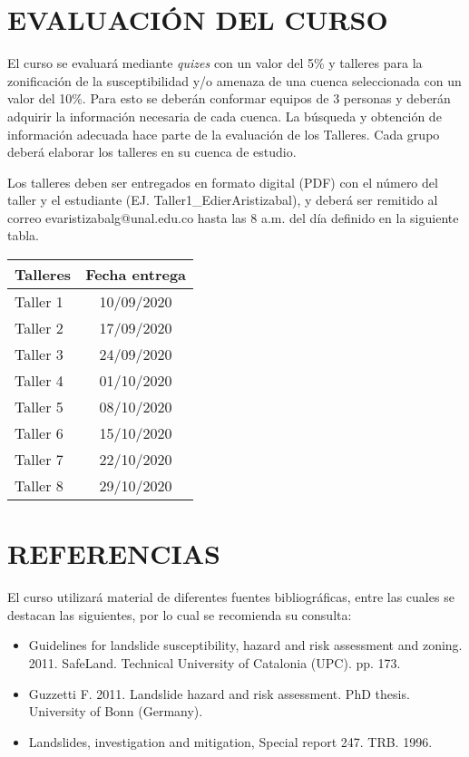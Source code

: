 \documentclass[twoside,11pt,]{article}
\begin{document}
\section{EVALUACIÓN DEL CURSO}
El curso se evaluará mediante \emph{quizes} con un valor del 5\% y talleres para la zonificación de la susceptibilidad y/o amenaza de una cuenca seleccionada con un valor del 10\%. Para esto se deberán conformar equipos de 3 personas y deberán adquirir la información necesaria de cada cuenca. La búsqueda y obtención de información adecuada hace parte de la evaluación de los Talleres. Cada grupo deberá elaborar los talleres en su cuenca de estudio.
\par Los talleres deben ser entregados en formato digital (PDF) con el número del taller y el estudiante (EJ. Taller1\_EdierAristizabal), y deberá ser remitido al correo evaristizabalg@unal.edu.co hasta las 8 a.m. del día definido en la siguiente tabla.

\begin{table}[!hbt]
\centering
\label{tab-marks}
\begin{tabular}{|l|c|}
\hline {\bf Talleres} & {\bf Fecha entrega}\\
\hline Taller 1 & 10/09/2020\\
\hline Taller 2 & 17/09/2020\\
\hline Taller 3 & 24/09/2020\\
\hline Taller 4 & 01/10/2020\\
\hline Taller 5 & 08/10/2020\\
\hline Taller 6 & 15/10/2020\\
\hline Taller 7 & 22/10/2020\\
\hline Taller 8 & 29/10/2020\\
\hline
\end{tabular}
\end{table}

\section{REFERENCIAS}
El curso utilizará material de diferentes fuentes bibliográficas, entre las cuales se destacan las siguientes, por lo cual se recomienda su consulta:
\begin{itemize}
\item Guidelines for landslide susceptibility, hazard and risk assessment and zoning. 2011. SafeLand. Technical University of Catalonia (UPC). pp. 173.
\item Guzzetti F. 2011. Landslide hazard and risk assessment. PhD  thesis. University of Bonn (Germany). 
\item Landslides, investigation and mitigation, Special report 247. TRB. 1996.
\end{itemize}
\end{document}
